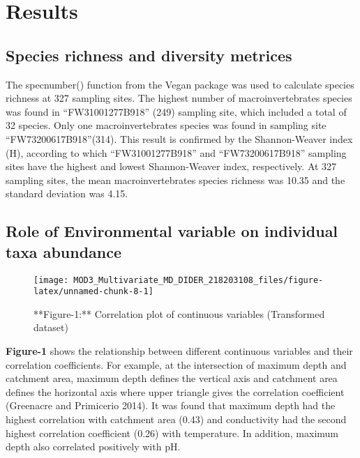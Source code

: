 \documentclass[
]{article}
\begin{document}
\hypertarget{results}{%
\section{Results}\label{results}}

\hypertarget{species-richness-and-diversity-metrices}{%
\subsection{Species richness and diversity
metrices}\label{species-richness-and-diversity-metrices}}

The specnumber() function from the Vegan package was used to calculate
species richness at 327 sampling sites. The highest number of
macroinvertebrates species was found in ``FW31001277B918'' (249)
sampling site, which included a total of 32 species. Only one
macroinvertebrates species was found in sampling site
``FW73200617B918''(314). This result is confirmed by the Shannon-Weaver
index (H), according to which ``FW31001277B918'' and ``FW73200617B918''
sampling sites have the highest and lowest Shannon-Weaver index,
respectively. At 327 sampling sites, the mean macroinvertebrates species
richness was 10.35 and the standard deviation was 4.15.

\hypertarget{role-of-environmental-variable-on-individual-taxa-abundance}{%
\subsection{Role of Environmental variable on individual taxa
abundance}\label{role-of-environmental-variable-on-individual-taxa-abundance}}

\begin{figure}

{\centering \texttt{[image: MOD3\_Multivariate\_MD\_DIDER\_218203108\_files/figure-latex/unnamed-chunk-8-1]} 

}

\caption{**Figure-1:** Correlation plot of continuous variables (Transformed dataset)}\label{fig:unnamed-chunk-8}
\end{figure}

\textbf{Figure-1} shows the relationship between different continuous
variables and their correlation coefficients. For example, at the
intersection of maximum depth and catchment area, maximum depth defines
the vertical axis and catchment area defines the horizontal axis where
upper triangle gives the correlation coefficient (Greenacre and
Primicerio 2014). It was found that maximum depth had the highest
correlation with catchment area (0.43) and conductivity had the second
highest correlation coefficient (0.26) with temperature. In addition,
maximum depth also correlated positively with pH.
\end{document}
